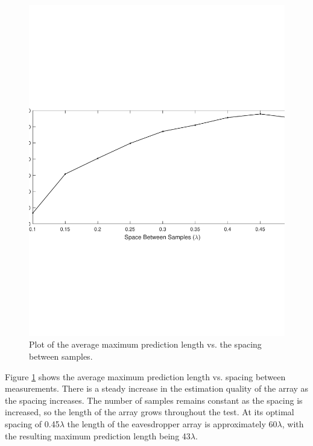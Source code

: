 \documentclass{allertonproc}
\begin{document}
\begin{figure}[tbp]
\begin{center}
\includegraphics[width=6in]{wavelengths}
\caption{Plot of the average maximum prediction length vs. the spacing between samples.}\label{spacing}
\end{center}
\end{figure}
Figure \ref{spacing} shows the average maximum prediction length vs. spacing between measurements. There is a steady increase in the estimation quality of the array as the spacing increases. The number of samples remains constant as the spacing is increased, so the length of the array grows throughout the test. At its optimal spacing of 0.45$\lambda$ the length of the eavesdropper array is approximately 60$\lambda$, with the resulting maximum prediction length being 43$\lambda$.
\end{document}
